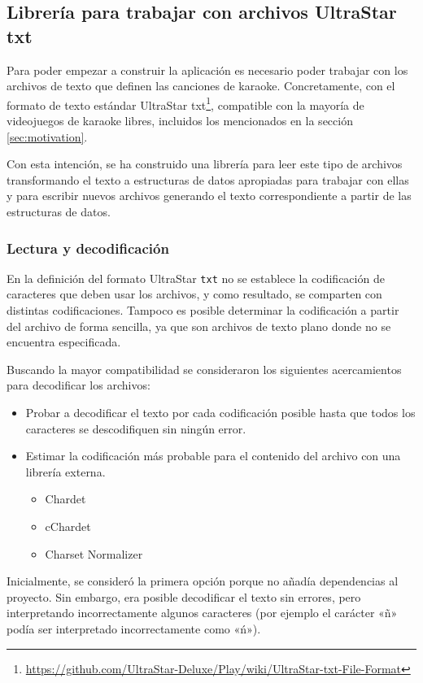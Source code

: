 \subsection{Librería para trabajar con archivos UltraStar txt}
\label{sec:txtparser}

Para poder empezar a construir la aplicación es necesario poder trabajar con los archivos de texto que definen las canciones de karaoke. Concretamente, con el formato de texto estándar UltraStar txt\footnote{\url{https://github.com/UltraStar-Deluxe/Play/wiki/UltraStar-txt-File-Format}},  compatible con la mayoría de videojuegos de karaoke libres, incluidos los mencionados en la sección \ref{sec:motivation}.

Con esta intención, se ha construido una librería para leer este tipo de archivos transformando el texto a estructuras de datos apropiadas para trabajar con ellas y para escribir nuevos archivos generando el texto correspondiente a partir de las estructuras de datos.

\subsubsection{Lectura y decodificación}

En la definición del formato UltraStar \texttt{txt} no se establece la codificación de caracteres que deben usar los archivos, y como resultado, se comparten con distintas codificaciones. Tampoco es posible determinar la codificación a partir del archivo de forma sencilla, ya que son archivos de texto plano donde no se encuentra especificada.

Buscando la mayor compatibilidad se consideraron los siguientes acercamientos para decodificar los archivos:

\begin{itemize}
	\item{Probar a decodificar el texto por cada codificación posible hasta que todos los caracteres se descodifiquen sin ningún error.}
	\item{Estimar la codificación más probable para el contenido del archivo con una librería externa.}
	\begin{itemize}
		\item{Chardet}
		\item{cChardet}
		\item{Charset Normalizer}
	\end{itemize}
\end{itemize}

Inicialmente, se consideró la primera opción porque no añadía dependencias al proyecto. Sin embargo, era posible decodificar el texto sin errores, pero interpretando incorrectamente algunos caracteres (por ejemplo el carácter «ñ» podía ser interpretado incorrectamente como «ń»).

